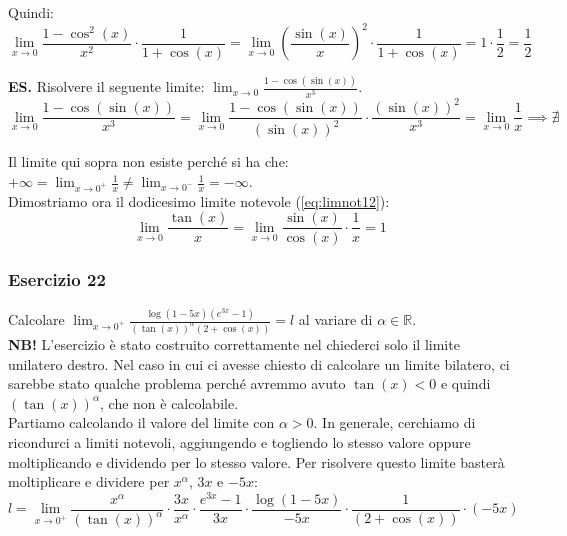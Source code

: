 \documentclass{article}
\begin{document}
\noindent Quindi:
\begin{equation*}
    \lim_{x \to 0} \frac{1 - \cos^2(x)}{x^2} \cdot \frac{1}{1 + \cos(x)} = \lim_{x \to 0} \left(\frac{\sin(x)}{x}\right)^2 \cdot \frac{1}{1 + \cos(x)} = 1 \cdot \frac{1}{2} = \frac{1}{2}
\end{equation*}

\noindent\textbf{ES.} Risolvere il seguente limite: $\lim_{x \to 0} \frac{1 - \cos(\sin(x))}{x^3}$.
\begin{equation*}
    \lim_{x \to 0} \frac{1 - \cos(\sin(x))}{x^3} = \lim_{x \to 0} \frac{1 - \cos(\sin(x))}{(\sin(x))^2} \cdot \frac{(\sin(x))^2}{x^3} = \lim_{x \to 0} \frac{1}{x} \implies \nexists
\end{equation*}

\noindent Il limite qui sopra non esiste perché si ha che: $+\infty 
 = \lim_{x \to 0^+} \frac{1}{x} \neq \lim_{x \to 0^-} \frac{1}{x} = -\infty$.\\

\noindent Dimostriamo ora il dodicesimo limite notevole (\ref{eq:limnot12}):
\begin{equation*}
    \lim_{x \to 0} \frac{\tan(x)}{x} = \lim_{x \to 0} \frac{\sin(x)}{\cos(x)} \cdot \frac{1}{x} = 1
\end{equation*}

\subsubsection{Esercizio 22}
Calcolare $\lim_{x \to 0^+} \frac{\log(1 - 5x)(e^{3x} - 1)}{(\tan(x))^\alpha(2 + \cos(x))} = l$ al variare di $\alpha \in \mathbb{R}$.\\

\noindent\textbf{NB!} L'esercizio è stato costruito correttamente nel chiederci solo il limite unilatero destro. Nel caso in cui ci avesse chiesto di calcolare un limite bilatero, ci sarebbe stato qualche problema perché avremmo avuto $\tan(x) < 0$ e quindi $(\tan(x))^\alpha$, che non è calcolabile.\\

\noindent Partiamo calcolando il valore del limite con $\alpha > 0$. In generale, cerchiamo di ricondurci a limiti notevoli, aggiungendo e togliendo lo stesso valore oppure moltiplicando e dividendo per lo stesso valore. Per risolvere questo limite basterà moltiplicare e dividere per $x^\alpha$, $3x$ e $-5x$:
\begin{equation*}
    l = \lim_{x \to 0^+} \frac{x^\alpha}{(\tan(x))^\alpha} \cdot \frac{3x}{x^\alpha} \cdot \frac{e^{3x} - 1}{3x} \cdot \frac{\log(1 - 5x)}{-5x} \cdot \frac{1}{(2 + \cos(x))} \cdot (-5x)
\end{equation*}
\end{document}
